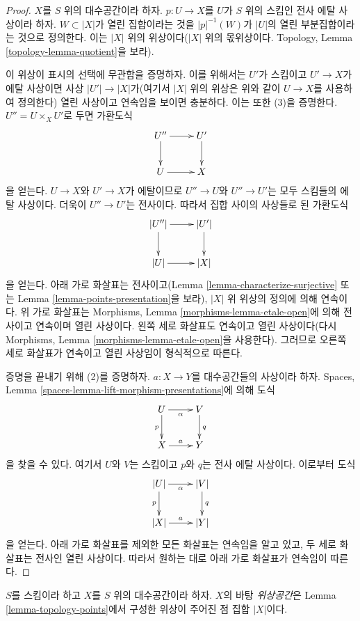 \begin{proof}
$X$를 $S$ 위의 대수공간이라 하자.
$p : U \to X$를 $U$가 $S$ 위의 스킴인 전사 에탈 사상이라 하자.
$W \subset |X|$가 열린 집합이라는 것을
$|p|^{-1}(W)$가 $|U|$의 열린 부분집합이라는 것으로 정의한다.
이는 $|X|$ 위의 위상이다($|X|$ 위의 몫위상이다.
Topology, Lemma \ref{topology-lemma-quotient}을 보라).

\medskip\noindent
이 위상이 표시의 선택에 무관함을 증명하자. 이를 위해서는
$U'$가 스킴이고 $U' \to X$가 에탈 사상이면
사상 $|U'| \to |X|$가(여기서 $|X|$ 위의 위상은 위와 같이
$U \to X$를 사용하여 정의한다) 열린 사상이고 연속임을 보이면
충분하다. 이는 또한 (3)을 증명한다.
$U'' = U \times_X U'$로 두면 가환도식
$$
\xymatrix{
U'' \ar[r] \ar[d] & U' \ar[d] \\
U \ar[r] & X
}
$$
을 얻는다. $U \to X$와 $U' \to X$가 에탈이므로
$U'' \to U$와 $U'' \to U'$는 모두 스킴들의 에탈 사상이다.
더욱이 $U'' \to U'$는 전사이다. 따라서 집합 사이의 사상들로 된
가환도식
$$
\xymatrix{
|U''| \ar[r] \ar[d] & |U'| \ar[d] \\
|U| \ar[r] & |X|
}
$$
을 얻는다. 아래 가로 화살표는 전사이고(Lemma
\ref{lemma-characterize-surjective} 또는 Lemma
\ref{lemma-points-presentation}을 보라),
$|X|$ 위 위상의 정의에 의해 연속이다.
위 가로 화살표는 Morphisms, Lemma
\ref{morphisms-lemma-etale-open}에 의해 전사이고 연속이며 열린
사상이다. 왼쪽 세로 화살표도 연속이고 열린 사상이다(다시
Morphisms, Lemma \ref{morphisms-lemma-etale-open}을 사용한다).
그러므로 오른쪽 세로 화살표가 연속이고 열린 사상임이 형식적으로 따른다.

\medskip\noindent
증명을 끝내기 위해 (2)를 증명하자.
$a : X \to Y$를 대수공간들의 사상이라 하자.
Spaces, Lemma \ref{spaces-lemma-lift-morphism-presentations}에 의해
도식
$$
\xymatrix{
U \ar[d]_p \ar[r]_\alpha & V \ar[d]^q \\
X \ar[r]^a & Y
}
$$
을 찾을 수 있다. 여기서 $U$와 $V$는 스킴이고 $p$와 $q$는
전사 에탈 사상이다. 이로부터 도식
$$
\xymatrix{
|U| \ar[d]_p \ar[r]_\alpha & |V| \ar[d]^q \\
|X| \ar[r]^a & |Y|
}
$$
을 얻는다. 아래 가로 화살표를 제외한 모든 화살표는 연속임을
알고 있고, 두 세로 화살표는 전사인 열린 사상이다.
따라서 원하는 대로 아래 가로 화살표가 연속임이 따른다.
\end{proof}

\begin{definition}
\label{definition-topological-space}
$S$를 스킴이라 하고 $X$를 $S$ 위의 대수공간이라 하자.
$X$의 바탕 {\it 위상공간}은 Lemma
\ref{lemma-topology-points}에서 구성한 위상이 주어진 점 집합
$|X|$이다.
\end{definition}

